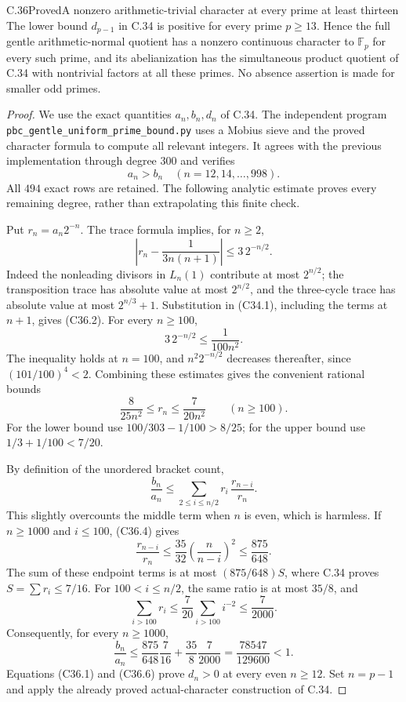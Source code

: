 \begin{statement}{C.36}{Proved}{A nonzero arithmetic-trivial character at every prime at least thirteen}
The lower bound $d_{p-1}$ in C.34 is positive for every
prime $p\geq13$.  Hence the full gentle arithmetic-normal
quotient has a nonzero continuous character to
$\mathbb F_p$ for every such prime, and its abelianization
has the simultaneous product quotient of C.34 with
nontrivial factors at all these primes.
No absence assertion is made for smaller odd primes.
\end{statement}
\begin{proof}
We use the exact quantities $a_n,b_n,d_n$ of C.34.
The independent program
\texttt{pbc\_gentle\_uniform\_prime\_bound.py}
uses a Mobius sieve and the proved character formula
to compute all relevant integers.
It agrees with the previous implementation through
degree $300$ and verifies
\[
                 a_n>b_n\quad
                   (n=12,14,\ldots,998).                        \tag{C36.1}
\]
All $494$ exact rows are retained.  The following
analytic estimate proves every remaining degree,
rather than extrapolating this finite check.

Put $r_n=a_n2^{-n}$.  The trace formula implies, for
$n\geq2$,
\[
 \left|r_n-\frac1{3n(n+1)}\right|\leq3\,2^{-n/2}.                \tag{C36.2}
\]
Indeed the nonleading divisors in $L_n(1)$ contribute
at most $2^{n/2}$; the transposition trace has absolute
value at most $2^{n/2}$, and the three-cycle trace
has absolute value at most $2^{n/3}+1$.
Substitution in (C34.1), including the terms at $n+1$,
gives (C36.2).
For every $n\geq100$,
\[
 3\,2^{-n/2}\leq\frac1{100n^2}.
                                                               \tag{C36.3}
\]
The inequality holds at $n=100$, and
$n^2 2^{-n/2}$ decreases thereafter, since
$(101/100)^4<2$.
Combining these estimates gives the convenient rational
bounds
\[
             \frac8{25n^2}\leq r_n\leq\frac7{20n^2}
                         \qquad(n\geq100).                     \tag{C36.4}
\]
For the lower bound use
$100/303-1/100>8/25$; for the upper bound use
$1/3+1/100<7/20$.

By definition of the unordered bracket count,
\[
 \frac{b_n}{a_n}
    \leq\sum_{2\leq i\leq n/2}
                       r_i\,\frac{r_{n-i}}{r_n}.               \tag{C36.5}
\]
This slightly overcounts the middle term when $n$ is even,
which is harmless.
If $n\geq1000$ and $i\leq100$, (C36.4) gives
\[
 \frac{r_{n-i}}{r_n}
   \leq\frac{35}{32}\left(\frac{n}{n-i}\right)^2
   \leq\frac{875}{648}.
\]
The sum of these endpoint terms is at most
$(875/648)S$, where C.34 proves
$S=\sum r_i\leq7/16$.
For $100<i\leq n/2$, the same ratio is at most $35/8$,
and
\[
            \sum_{i>100}r_i
               \leq\frac7{20}\sum_{i>100}i^{-2}
               \leq\frac7{2000}.
\]
Consequently, for every $n\geq1000$,
\[
 \frac{b_n}{a_n}
 \leq \frac{875}{648}\frac7{16}
           +\frac{35}{8}\frac7{2000}
       =\frac{78547}{129600}<1.                                \tag{C36.6}
\]
Equations (C36.1) and (C36.6) prove $d_n>0$ at every
even $n\geq12$.  Set $n=p-1$ and apply the already
proved actual-character construction of C.34.
\end{proof}


